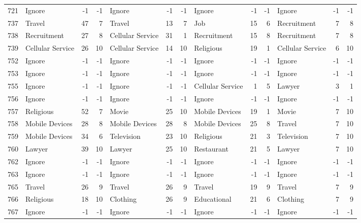 \begin{figure}[htbp]
\begin{tabular}{rlrrlrrlrrlrr}
    721   & Ignore & -1    & -1    & Ignore & -1    & -1    & Ignore & -1    & -1    & Ignore & -1    & -1 \\
    737   & Travel & 47    & 7     & Travel & 13    & 7     & Job   & 15    & 6     & Recruitment & 7     & 8 \\
    738   & Recruitment & 27    & 8     & Cellular Service & 31    & 1     & Recruitment & 15    & 8     & Recruitment & 7     & 8 \\
    739   & Cellular Service & 26    & 10    & Cellular Service & 14    & 10    & Religious & 19    & 1     & Cellular Service & 6     & 10 \\
    752   & Ignore & -1    & -1    & Ignore & -1    & -1    & Ignore & -1    & -1    & Ignore & -1    & -1 \\
    753   & Ignore & -1    & -1    & Ignore & -1    & -1    & Ignore & -1    & -1    & Ignore & -1    & -1 \\
    755   & Ignore & -1    & -1    & Ignore & -1    & -1    & Cellular Service & 1     & 5     & Lawyer & 3     & 1 \\
    756   & Ignore & -1    & -1    & Ignore & -1    & -1    & Ignore & -1    & -1    & Ignore & -1    & -1 \\
    757   & Religious & 52    & 7     & Movie & 25    & 10    & Mobile Devices & 19    & 1     & Movie & 7     & 10 \\
    758   & Mobile Devices & 28    & 8     & Mobile Devices & 28    & 8     & Mobile Devices & 25    & 8     & Travel & 7     & 10 \\
    759   & Mobile Devices & 34    & 6     & Television & 23    & 10    & Religious & 21    & 3     & Television & 7     & 10 \\
    760   & Lawyer & 39    & 10    & Lawyer & 25    & 10    & Restaurant & 21    & 5     & Lawyer & 7     & 10 \\
    762   & Ignore & -1    & -1    & Ignore & -1    & -1    & Ignore & -1    & -1    & Ignore & -1    & -1 \\
    763   & Ignore & -1    & -1    & Ignore & -1    & -1    & Ignore & -1    & -1    & Ignore & -1    & -1 \\
    765   & Travel & 26    & 9     & Travel & 26    & 9     & Travel & 19    & 9     & Travel & 7     & 9 \\
    766   & Religious & 18    & 10    & Clothing & 26    & 9     & Educational & 21    & 6     & Clothing & 7     & 9 \\
    767   & Ignore & -1    & -1    & Ignore & -1    & -1    & Ignore & -1    & -1    & Ignore & -1    & -1 \\

\end{tabular}
\end{figure}
